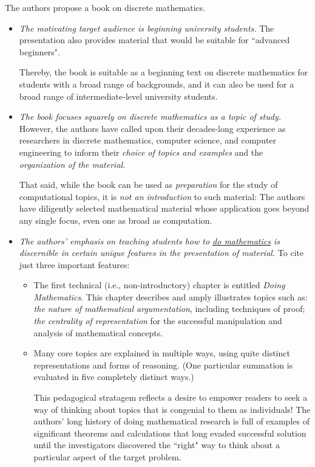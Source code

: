 \documentclass{article}[12pt]
\begin{document}
\noindent
The authors propose a book on discrete mathematics.
\begin{itemize}
\item
{\em The motivating target audience is beginning university students.}  The presentation also provides material that would be suitable for ``advanced beginners".

\smallskip

Thereby, the book is suitable as a beginning text on discrete mathematics for students with a broad range of backgrounds, and it can also be used for a broad range of intermediate-level university students.

\item
{\em The book focuses squarely on discrete mathematics as a topic of study.}  However, the authors have called upon their decades-long experience as researchers in discrete mathematics, computer science, and computer engineering to inform their {\em choice of topics and examples} and the {\em organization of the material}.

\smallskip

That said, while the book can be used as {\em preparation} for the study of computational topics, it is {\em not an introduction} to such material: The authors have diligently selected mathematical material whose application goes beyond any single focus, even one as broad as computation.

\item
{\em The authors' emphasis on teaching students how to \underline{do mathematics} is discernible in certain unique features in the presentation of material.}  To cite just three important features: 
  \begin{itemize}
  \item
The first technical (i.e., non-introductory) chapter is entitled {\em Doing Mathematics}.  This chapter describes and amply illustrates topics such as: {\em the nature of mathematical argumentation}, including techniques of proof; {\em the centrality of representation} for the successful manipulation and analysis of mathematical concepts.

  \item
Many core topics are explained in multiple ways, using quite distinct representations and forms of reasoning.  (One particular summation is evaluated in five completely distinct ways.)

\smallskip

This pedagogical stratagem reflects a desire to empower readers to seek a way of thinking about topics that is congenial to them as individuals!  The authors' long history of doing mathematical research is full of examples of significant theorems and calculations that long evaded successful solution until the investigators discovered the ``right" way to think about a particular aspect of the target problem.


\end{itemize}
\end{itemize}
\end{document}
